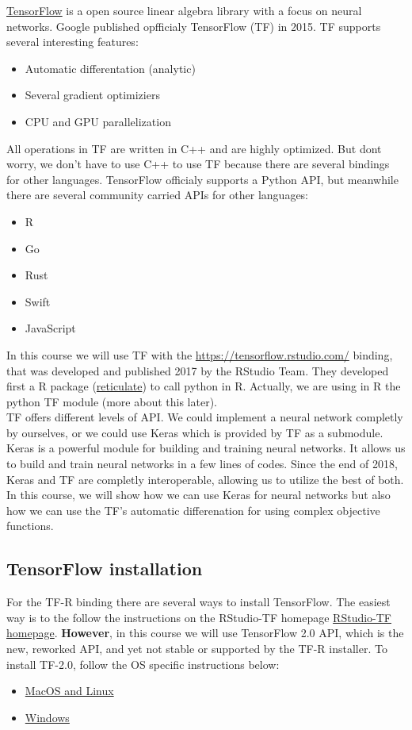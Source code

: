 \documentclass[a4paper,twoside]{tufte-book}\usepackage[]{graphicx}\usepackage[]{color}
\begin{document}
\href{https://www.tensorflow.org/}{TensorFlow} is a open source linear algebra library with a focus on neural networks. 
%
Google published opfficialy TensorFlow (TF) in 2015. 
%
TF supports several interesting features:
%
\begin{itemize}
\item Automatic differentation (analytic)
\item Several gradient optimiziers
\item CPU and GPU parallelization
\end{itemize}
%
All operations in TF are written in C++ and are highly optimized. 
%
But dont worry, we don't have to use C++ to use TF because there are several bindings for other languages.
%
TensorFlow officialy supports a Python API, but meanwhile there are several community carried APIs for other languages:
%
\begin{itemize}
\item R
\item Go
\item Rust
\item Swift
\item JavaScript
\end{itemize}
%
In this course we will use TF with the \href{R}{https://tensorflow.rstudio.com/} binding, that was developed and published 2017 by the RStudio Team.
%
They developed first a R package (\href{https://rstudio.github.io/reticulate/}{reticulate}) to call python in R. 
%
Actually, we are using in R the python TF module (more about this later). \\
%
TF offers different levels of API.
%
We could implement a neural network completly by ourselves, or we could use Keras which is provided by TF as a submodule.
%
Keras is a powerful module for building and training neural networks.
%
It allows us to build and train neural networks in a few lines of codes.
%
Since the end of 2018, Keras and TF are completly interoperable, allowing us to utilize the best of both.
%
In this course, we will show how we can use Keras for neural networks but also how we can use the TF's automatic differenation for using complex objective functions. 
%

\subsection{TensorFlow installation}
For the TF-R binding there are several ways to install TensorFlow. 
%
The easiest way is to the follow the instructions on the RStudio-TF homepage \href{https://tensorflow.rstudio.com/tensorflow/articles/installation.html}{RStudio-TF homepage}.
%
\textbf{However}, in this course we will use TensorFlow 2.0 API, which is the new, reworked API, and yet not stable or supported by the TF-R installer.   
%
To install TF-2.0, follow the OS specific instructions below:
%
\begin{itemize}
\item \hyperref[Mac]{MacOS and Linux}
\item \hyperref[Windows]{Windows}
\end{itemize}
\end{document}
